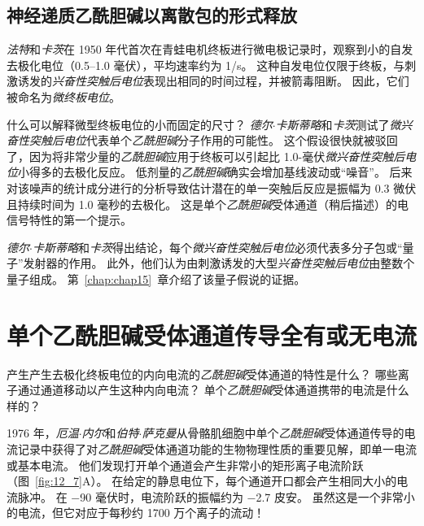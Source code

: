 \subsection{神经递质乙酰胆碱以离散包的形式释放}

\textit{法特}和\textit{卡茨}在 1950 年代首次在青蛙电机终板进行微电极记录时，观察到小的自发去极化电位（0.5–1.0 毫伏），平均速率约为 1/s。 
这种自发电位仅限于终板，与刺激诱发的\textit{兴奋性突触后电位}表现出相同的时间过程，并被箭毒阻断。 
因此，它们被命名为\textit{微终板电位}。


什么可以解释微型终板电位的小而固定的尺寸？ 
\textit{德尔$\cdot$卡斯蒂略}和\textit{卡茨}测试了\textit{微兴奋性突触后电位}代表单个\textit{乙酰胆碱}分子作用的可能性。
这个假设很快就被驳回了，因为将非常少量的\textit{乙酰胆碱}应用于终板可以引起比 1.0-毫伏\textit{微兴奋性突触后电位}小得多的去极化反应。 
低剂量的\textit{乙酰胆碱}确实会增加基线波动或“噪音”。 
后来对该噪声的统计成分进行的分析导致估计潜在的单一突触后反应是振幅为 0.3 微伏且持续时间为 1.0 毫秒的去极化。 
这是单个\textit{乙酰胆碱}受体通道（稍后描述）的电信号特性的第一个提示。


\textit{德尔$\cdot$卡斯蒂略}和\textit{卡茨}得出结论，每个\textit{微兴奋性突触后电位}必须代表多分子包或“量子”发射器的作用。 
此外，他们认为由刺激诱发的大型\textit{兴奋性突触后电位}由整数个量子组成。 
第~\ref{chap:chap15}~章介绍了该量子假说的证据。



\section{单个乙酰胆碱受体通道传导全有或无电流}

产生产生去极化终板电位的内向电流的\textit{乙酰胆碱}受体通道的特性是什么？
哪些离子通过通道移动以产生这种内向电流？
单个\textit{乙酰胆碱}受体通道携带的电流是什么样的？


1976 年，\textit{厄温$\cdot$内尔}和\textit{伯特$\cdot$萨克曼}从骨骼肌细胞中单个\textit{乙酰胆碱}受体通道传导的电流记录中获得了对\textit{乙酰胆碱}受体通道功能的生物物理性质的重要见解，即单一电流或基本电流。
他们发现打开单个通道会产生非常小的矩形离子电流阶跃（图~\ref{fig:12_7}A）。
在给定的静息电位下，每个通道开口都会产生相同大小的电流脉冲。
在 −90 毫伏时，电流阶跃的振幅约为 −2.7 皮安。 
虽然这是一个非常小的电流，但它对应于每秒约 1700 万个离子的流动！


